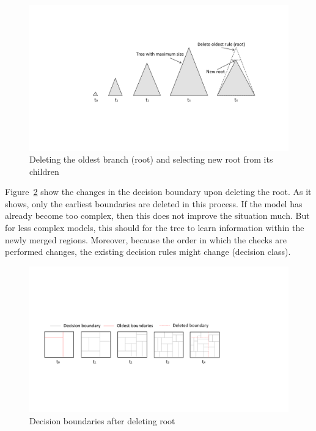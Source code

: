 \begin{figure}[htbp]
    \begin{center}
        \includegraphics[width=14.0cm]{figs/deleteroot.pdf}
        \caption{Deleting the oldest branch (root) and selecting new root from its children}
        \label{fig:algo:delroot}
    \end{center}
\end{figure}

Figure~\ref{fig:algo:delrootdb} show the changes in the decision boundary upon deleting the root. As it shows, only the earliest boundaries are deleted in this process. If the model has already become too complex, then this does not improve the situation much. But for less complex models, this should for the tree to learn information within the newly merged regions. Moreover, because the order in which the checks are performed changes, the existing decision rules might change (decision class).

\begin{figure}[htbp]
    \begin{center}
        \includegraphics[width=14.0cm]{figs/deleterootdb.pdf}
        \caption{Decision boundaries after deleting root}
        \label{fig:algo:delrootdb}
    \end{center}
\end{figure}


